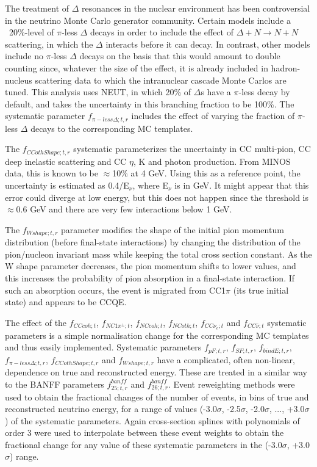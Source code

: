 \begin{enumerate}
The treatment of $\Delta$ resonances in the nuclear environment has been controversial in the neutrino
Monte Carlo generator community. Certain models include a ~20\%-level of $\pi$-less $\Delta$ decays in order
to include the effect of $\Delta+N \rightarrow N+N$ scattering, in which the $\Delta$ interacts before it can decay. 
In contrast, other models include no $\pi$-less 
$\Delta$ decays on the basis that this would amount to double counting since, whatever the size of the effect, 
it is already included in hadron-nucleus scattering data to which the intranuclear cascade Monte Carlos are tuned.
This analysis uses NEUT, in which 20\% of $\Delta$s have a $\pi$-less decay by default, and takes the uncertainty in this 
branching fraction to be 100\%. 
The systematic parameter $f_{\pi-less\Delta; t, r}$ includes the effect of varying the fraction of $\pi$-less $\Delta$ 
decays to the corresponding MC templates.

The $f_{CCothShape;t,r}$ systematic parameterizes the uncertainty in CC multi-pion, CC deep inelastic scattering and CC $\eta$, K and photon production. 
From MINOS data, this is known to be $\approx$10\% at 4 GeV. Using this as a reference point, 
the uncertainty is estimated as 0.4/E$_{\nu}$, where E$_{\nu}$ is in GeV. It might appear that this error could diverge at 
low energy, but this does not happen since the threshold is $\approx$0.6 GeV and there are very 
few interactions below 1 GeV. 

The $f_{Wshape;t,r}$ parameter modifies the shape of the initial pion momentum distribution (before final-state interactions) 
by changing the distribution of the pion/nucleon invariant mass while keeping the total cross section constant. As the 
W shape parameter decreases, the pion momentum shifts to lower values, and this increases the probability of pion 
absorption in a final-state interaction. If such an absorption occurs, the event is migrated from CC1$\pi$ (its 
true initial state) and appears to be CCQE.

The effect of the $f_{CCcoh; t}$, $f_{NC1\pi^\pm; t}$, $f_{NCcoh; t}$, $f_{NCoth; t}$, $f_{CC\nu_e; t}$ and $f_{CC\bar{\nu}; t}$ 
systematic parameters is a simple normalisation change for the corresponding MC templates and thus easily implemented.
Systematic parameters $f_{pF; t, r}$, $f_{SF; t, r}$, $f_{bindE; t, r}$, $f_{\pi-less\Delta; t, r}$, $f_{CCothShape; t, r}$ 
and $f_{Wshape; t, r}$  have a complicated, often non-linear, dependence on true and reconstructed energy.
These are treated in a similar way to the BANFF parameters $f_{25; t, r}^{banff}$ and $f_{26; t, r}^{banff}$.
Event reweighting methods were used to obtain the fractional changes of the number of events, 
in bins of true and reconstructed neutrino energy, for a range of values (-3.0$\sigma$, -2.5$\sigma$, -2.0$\sigma$, ..., +3.0$\sigma$) of the systematic parameters. 
Again cross-section splines with polynomials of order 3 were used to interpolate between these event 
weights to obtain the fractional change for any value of these systematic parameters in the (-3.0$\sigma$, +3.0$\sigma$) range.


\end{enumerate}
